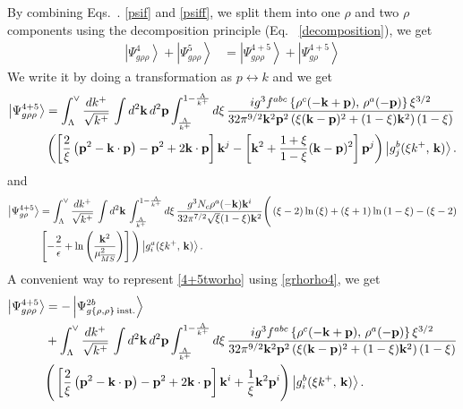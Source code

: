 \documentclass[10pt]{article}
\numberwithin{equation}{section}
\begin{document}
By combining Eqs.~. \eqref{psif} and \eqref{psiff}, we split them into one $\rho$ and two $\rho$ components using the decomposition principle (Eq.~ \eqref{decomposition}), we get 
\begin{align}
    \left|\Psi_{g\rho\rho}^{4}\right\rangle + \left|\Psi_{g\rho\rho}^{5}\right\rangle & =  \left|\Psi_{g\rho\rho}^{4+5}\right\rangle + \left|\Psi_{g\rho}^{4+5}\right\rangle
\end{align}
We write it by doing a transformation as $p\leftrightarrow k$ and we get 
\begin{align}\label{4+5tworho}
\left|\Psi_{g\rho\rho}^{4+5}\right\rangle & =
\int_{\Lambda}^{\vee}\frac{dk^{+}}{\sqrt{k^{+}}}\,\int d^{2}\mathbf{k}\, d^{2}\mathbf{p}\int_{\frac{\Lambda}{k^{+}}}^{1-\frac{\Lambda}{k^{+}}}d\xi\,\frac{ig^{3}f^{abc}\left\{ \rho^{c}(-\mathbf{k}+\mathbf{p}),\,\rho^{a}(-\mathbf{p})\right\} \xi^{3/2}}{32\pi^{9/2}\mathbf{k}^{2}\mathbf{p}^{2}\left(\xi(\mathbf{k}-\mathbf{p})^{2}+(1-\xi)\mathbf{k}^{2}\right)(1-\xi)}\notag \\ & \left(\left[\frac{2}{\xi}\left(\mathbf{p}^{2}-\mathbf{k}\cdot \mathbf{p}\right)-\mathbf{p}^{2}+2\mathbf{k}\cdot \mathbf{p}\right]\mathbf{k}^{j}-\left[\mathbf{k}^{2}+\frac{1+\xi}{1-\xi}(\mathbf{k}-\mathbf{p})^{2}\right]\mathbf{p}^{j}\right)\left|g_{j}^{b}(\xi k^{+},\, \mathbf{k})\right\rangle.
\end{align}
and
\begin{align}\label{4+5onerho}
   \left|\Psi_{g\rho}^{4+5}\right\rangle & =  \int_{\Lambda}^{\vee}\frac{dk^{+}}{\sqrt{k^{+}}}\,\int d^{2}\mathbf{k}\,\int_{\frac{\Lambda}{k^{+}}}^{1-\frac{\Lambda}{k^{+}}}d\xi\,\frac{g^{3}N_{c}\rho^{a}(-\mathbf{k})\mathbf{k}^{i}}{32\pi^{7/2}\sqrt{\xi}(1-\xi)\mathbf{k}^{2}}\Bigg(\left(\xi-2\right)\ln\left(\xi\right)+\left(\xi+1\right)\ln\left(1-\xi\right)-\left(\xi-2\right)\notag \\ & \left[-\frac{2}{\epsilon}+\ln\left(\frac{\mathbf{k}^{2}}{\mu_{\overline{MS}}^{2}}\right)\right]\Bigg)\left|g_{i}^{a}(\xi k^{+},\, \mathbf{k})\right\rangle.
\end{align}
A convenient way to represent \eqref{4+5tworho} using \eqref{grhorho4}, we get
\begin{align}\label{4+5tworhosimpl}
\left|\Psi_{g\rho\rho}^{4+5}\right\rangle & =-\left|\Psi_{g\{\rho,\rho\}\:\text{inst.}}^{2b}\right\rangle \notag \\ & 
+\int_{\Lambda}^{\vee}\frac{dk^{+}}{\sqrt{k^{+}}}\,\int d^{2}\mathbf{k}\, d^{2}\mathbf{p}\int_{\frac{\Lambda}{k^{+}}}^{1-\frac{\Lambda}{k^{+}}}d\xi\,\frac{ig^{3}f^{abc}\left\{ \rho^{c}(-\mathbf{k}+\mathbf{p}),\,\rho^{a}(-\mathbf{p})\right\} \xi^{3/2}}{32\pi^{9/2}\mathbf{k}^{2}\mathbf{p}^{2}\left(\xi(\mathbf{k}-\mathbf{p})^{2}+(1-\xi)\mathbf{k}^{2}\right)(1-\xi)}\notag \\ & \Bigg(\left[\frac{2}{\xi}\left(\mathbf{p}^{2}-\mathbf{k}\cdot \mathbf{p}\right)-\mathbf{p}^{2}+2\mathbf{k}\cdot \mathbf{p}\right]\mathbf{k}^{i}+\frac{1}{\xi}\mathbf{k}^{2}\mathbf{p}^{i}\Bigg)\left|g_{i}^{b}(\xi k^{+},\, \mathbf{k})\right\rangle.
\end{align}
\end{document}
